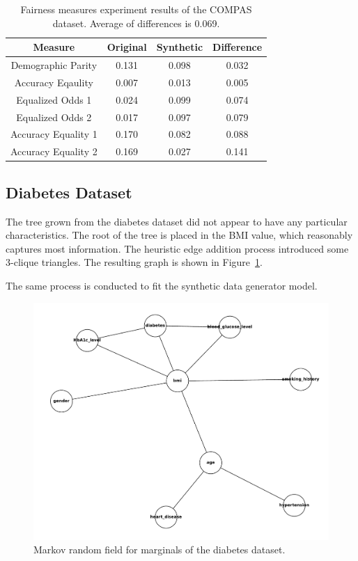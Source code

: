 \documentclass[manuscript,screen,review,anonymous]{acmart}
\begin{document}
\begin{table}[h]
\caption{Fairness measures experiment results of the COMPAS dataset. Average of differences is 0.069.}
\label{tab:compas_score}
\begin{tabular}{cccc}
\toprule
\textbf{Measure} & \textbf{Original} & \textbf{Synthetic} & \textbf{Difference} \\
\midrule
Demographic Parity     & 0.131 & 0.098 & 0.032 \\
Accuracy Eqaulity      & 0.007 & 0.013 & 0.005 \\
Equalized Odds 1       & 0.024 & 0.099 & 0.074 \\
Equalized Odds 2       & 0.017 & 0.097 & 0.079 \\
Accuracy Equality 1    & 0.170 & 0.082 & 0.088 \\
Accuracy Equality 2    & 0.169 & 0.027 & 0.141 \\
\bottomrule
\end{tabular}
\end{table}

\subsection{Diabetes Dataset}

The tree grown from the diabetes dataset did not appear to have any particular characteristics. The root of the tree is placed in the BMI value, which reasonably captures most information. The heuristic edge addition process introduced some 3-clique triangles. The resulting graph is shown in Figure~\ref{fig:diabetes_mst}.

The same process is conducted to fit the synthetic data generator model.

\begin{figure}[h]
\centering
\includegraphics[width=\linewidth]{diabetes_mst}
\caption{Markov random field for marginals of the diabetes dataset.}
\label{fig:diabetes_mst}
\end{figure}
\end{document}
